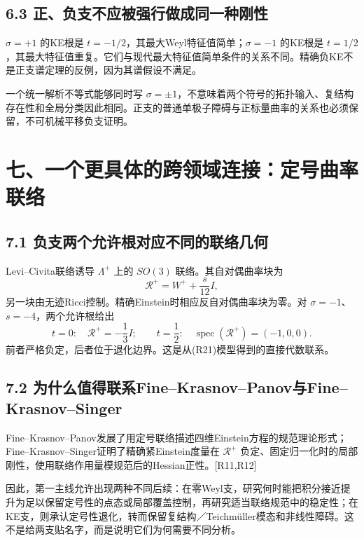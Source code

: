 \documentclass[
  11pt,
  a4paper,
  fontset=none]{ctexart}
\begin{document}
\subsection{6.3
正、负支不应被强行做成同一种刚性}\label{ux6b63ux8d1fux652fux4e0dux5e94ux88abux5f3aux884cux505aux6210ux540cux4e00ux79cdux521aux6027}

\(\sigma=+1\) 的KE根是 \(t=-1/2\)，其最大Weyl特征值简单；\(\sigma=-1\)
的KE根是
\(t=1/2\)，其最大特征值重复。它们与现代最大特征值简单条件的关系不同。精确负KE不是正支谱定理的反例，因为其谱假设不满足。

一个统一解析不等式能够同时写
\(\sigma=\pm1\)，不意味着两个符号的拓扑输入、复结构存在性和全局分类因此相同。正支的普通单极子障碍与正标量曲率的关系也必须保留，不可机械平移负支证明。

\section{七、一个更具体的跨领域连接：定号曲率联络}\label{ux4e03ux4e00ux4e2aux66f4ux5177ux4f53ux7684ux8de8ux9886ux57dfux8fdeux63a5ux5b9aux53f7ux66f2ux7387ux8054ux7edc}

\subsection{7.1
负支两个允许根对应不同的联络几何}\label{ux8d1fux652fux4e24ux4e2aux5141ux8bb8ux6839ux5bf9ux5e94ux4e0dux540cux7684ux8054ux7edcux51e0ux4f55}

Levi--Civita联络诱导 \(\Lambda^+\) 上的 \(SO(3)\) 联络。其自对偶曲率块为
\[
\mathcal R^+=W^++\frac{s}{12}I,
\] 另一块由无迹Ricci控制。精确Einstein时相应反自对偶曲率块为零。对
\(\sigma=-1\)、\(s=-4\)，两个允许根给出 \[
t=0:\quad\mathcal R^+=-\frac13I;
\qquad
t=\frac12:\quad\operatorname{spec}(\mathcal R^+)=(-1,0,0).
\] 前者严格负定，后者位于退化边界。这是从(R21)模型得到的直接代数联系。

\subsection{7.2
为什么值得联系Fine--Krasnov--Panov与Fine--Krasnov--Singer}\label{ux4e3aux4ec0ux4e48ux503cux5f97ux8054ux7cfbfinekrasnovpanovux4e0efinekrasnovsinger}

Fine--Krasnov--Panov发展了用定号联络描述四维Einstein方程的规范理论形式；Fine--Krasnov--Singer证明了精确紧Einstein度量在
\(\mathcal R^+\)
负定、固定归一化时的局部刚性，使用联络作用量模规范后的Hessian正性。{[}R11,R12{]}

因此，第一主线允许出现两种不同后续：在零Weyl支，研究何时能把积分接近提升为足以保留定号性的点态或局部覆盖控制，再研究适当联络规范中的稳定性；在KE支，则承认定号性退化，转而保留复结构／Teichmüller模态和非线性障碍。这不是给两支贴名字，而是说明它们为何需要不同分析。
\end{document}
